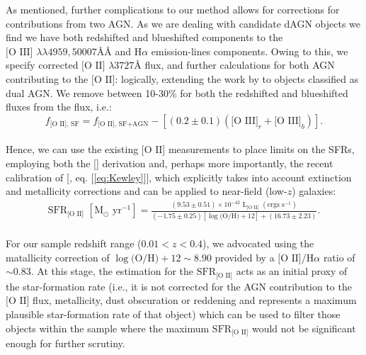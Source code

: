 As mentioned, further complications to our method allows for corrections for contributions from two AGN. As we are dealing with candidate dAGN objects we find we have both redshifted and blueshifted components to the $\text{[O III] }\lambda\lambda4959,50007ÅÅ$ and $\text{H}\alpha$ emission-lines components. Owing to this, we specify corrected $\text{[O II] }\lambda3727Å$ flux, and further calculations for both AGN contributing to the $\text{[O II]}$: logically, extending the work by \cite{2006ApJ...642..702K} to objects classified as dual AGN. We remove between 10-30\% for both the redshifted and blueshifted \text{[O III]} fluxes from the \text{[O II]} flux, i.e.:
\\
\begin{equation}
\label{eq:KimCorrection}
f_{\text{[O II], SF}}=f_{\text{[O II], SF+AGN}}-\left[(0.2\pm{0.1})(\text{[O III]}_r+\text{[O III]}_b)\right].
\end{equation}
\\

Hence, we can use the existing $\text{[O II]}$ measurements to place limits on the SFRs, employing both the [\cite{Kennicutt_1998}] derivation and, perhaps more importantly, the recent calibration of [\cite{Kewley_2004}, eq. [\ref{eq:Kewley}]], which explicitly takes into account extinction and metallicity corrections and can be applied to near-field (low-$z$) galaxies:
\\
\begin{equation}
\begin{align}
\label{eq:Kewley}
{\text{SFR}}_{\text{[O II]}}\,\,[\text{M}_\odot \text{ yr}^{-1}]=\frac{(9.53\pm{0.51})\times10^{-42}\,\,\text{L}_{\text{[O II]}}\,\,(\text{ergs }\text{s}^{-1})}{(-1.75\pm{0.25})[\log{\text{(O/H)}}+12]+(16.73\pm{2.23})}.
\end{align}
\end{equation}
\\
For our sample redshift range (${{0.01}<{z}<{0.4}}$), we advocated using the \cite{Teplitz_2003} matallicity correction of $\log{\text{(O/H)} +12}\sim{8.90}$ provided by a $\text{[O II]/H}\alpha$ ratio of $\sim{0.83}$. At this stage, the \cite{Kennicutt_1998} estimation for the $\text{SFR}_{\text{[O II]}}$ acts as an initial proxy of the star-formation rate (i.e., it is not corrected for the AGN contribution to the $\text{[O II]}$ flux, metallicity, dust obscuration or reddening and represents a maximum plausible star-formation rate of that object) which can be used to filter those objects within the sample where the maximum $\text{SFR}_{\text{[O II]}}$ would not be significant enough for further scrutiny.
